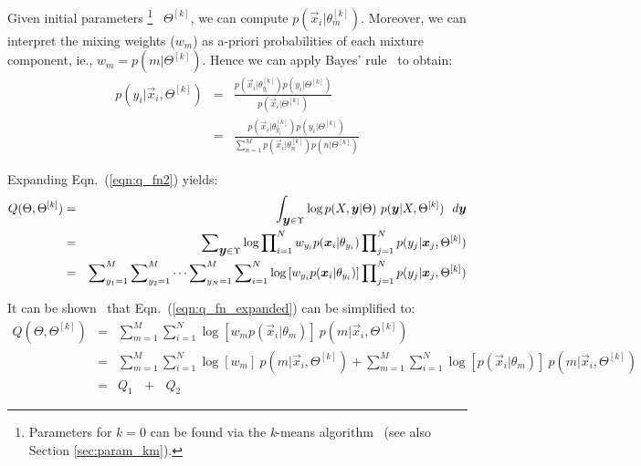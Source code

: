 \noindent
Given initial parameters%
%
\footnote{Parameters for $k=0$ can be found via the {\it k}-means algorithm~\cite{Duda01, Linde80} (see also Section \ref{sec:param_km}).}
%
~$\Theta^{[k]}$,
we can compute $p(\Vec{x}_i | \theta_m^{[k]})$.
Moreover, we can interpret the mixing weights ($w_m$) as {a-priori} probabilities of each mixture component, ie., $w_m = p(m | \Theta^{[k]})$.
Hence we can apply Bayes' rule~\cite{Duda01} to obtain:
%
\begin{eqnarray}
	p(y_i | \Vec{x}_i, \Theta^{[k]}) & = & \frac{ p(\Vec{x}_i | \theta_{y_i}^{[k]}) p(y_i | \Theta^{[k]}) }{ p(\Vec{x}_i | \Theta^{[k]}) } \\
	~ & = & \frac{ p(\Vec{x}_i | \theta_{y_i}^{[k]}) p(y_i | \Theta^{[k]}) }{ \sum\nolimits_{n=1}^{M} p(\Vec{x}_i | \theta_{n}^{[k]}) p(n | \Theta^{[k]})}
	\label{eqn:p_yi}
\end{eqnarray}

\noindent
Expanding Eqn.~(\ref{eqn:q_fn2}) yields:
%
\begin{eqnarray}
	Q(\Theta, \Theta^{[k]}) & = & \int_{\mbox{\boldmath $y$} \in \Upsilon}
									\log p(X,\mbox{\boldmath $y$} | \Theta) ~ p(\mbox{\boldmath $y$}|X,\Theta^{[k]}) ~~ d \mbox{\boldmath $y$} \\
							~ & = & \sum\nolimits_{\mbox{\boldmath $y$} \in \Upsilon}  \log \prod\nolimits_{i=1}^{N} w_{y_i} p(\Vec{x}_i | \theta_{y_i})  
																		\prod\nolimits_{j=1}^{N} p(y_j | \Vec{x}_j, \Theta^{[k]} ) \\
							~ & = & \sum\nolimits_{y_1=1}^{M} \sum\nolimits_{y_2=1}^{M} \cdots \sum\nolimits_{y_N=1}^{M} 
															\sum\nolimits_{i=1}^{N} \log \left[ w_{y_i} p(\Vec{x}_i | \theta_{y_i}) \right] 
															\prod\nolimits_{j=1}^{N} p(y_j | \Vec{x}_j, \Theta^{[k]} )  \label{eqn:q_fn_expanded}
\end{eqnarray}%

\noindent
It can be shown~\cite{Bilmes98} that Eqn.~(\ref{eqn:q_fn_expanded}) can be simplified to:
%
\begin{eqnarray}
	Q(\Theta, \Theta^{[k]}) & = & \sum\nolimits_{m=1}^{M}  \sum\nolimits_{i=1}^{N} \log[ w_m  p(\Vec{x}_i | \theta_m)] ~ p(m|\Vec{x}_i, \Theta^{[k]}) \\
							~ & = & \sum\nolimits_{m=1}^{M}  \sum\nolimits_{i=1}^{N} \log[ w_m ] ~  p(m|\Vec{x}_i, \Theta^{[k]}) +
									\sum\nolimits_{m=1}^{M}	\sum\nolimits_{i=1}^{N} \log[  p(\Vec{x}_i | \theta_m) ] ~ p(m|\Vec{x}_i, \Theta^{[k]}) ~~~ \\
							~ & = & Q_1 ~~~ + ~~~ Q_2 
\end{eqnarray}%

